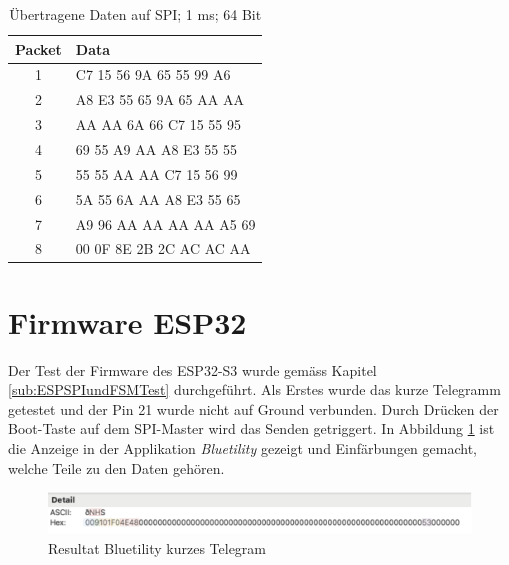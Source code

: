 \begin{table}[h!]
    \centering
    \begin{tabular}{c||l}
        \toprule
        \textbf{Packet} & \textbf{Data} \\ 
        \midrule
        1 & C7 15 56 9A 65 55 99 A6 \\
        2 & A8 E3 55 65 9A 65 AA AA \\
        3 & AA AA 6A 66 C7 15 55 95 \\
        4 & 69 55 A9 AA A8 E3 55 55 \\
        5 & 55 55 AA AA C7 15 56 99 \\
        6 & 5A 55 6A AA A8 E3 55 65 \\
        7 & A9 96 AA AA AA AA A5 69 \\
        8 & 00 0F 8E 2B 2C AC AC AA \\
        \bottomrule
    \end{tabular}
    \caption{Übertragene Daten auf SPI; 1 ms; 64 Bit}
    \label{tab:data_table}
\end{table}





\section{Firmware ESP32}
\label{sec:ResultatESP32}

Der Test der Firmware des ESP32-S3 wurde gemäss Kapitel \ref{sub:ESPSPIundFSMTest} durchgeführt. Als Erstes wurde das kurze Telegramm getestet und der Pin 21 wurde nicht auf Ground verbunden. Durch Drücken der Boot-Taste auf dem SPI-Master wird das Senden getriggert. In Abbildung \ref{fig:ResultatBLEKurz} ist die Anzeige in der Applikation \textit{Bluetility} gezeigt und Einfärbungen gemacht, welche Teile zu den Daten gehören.

\begin{figure}[H]
    \centering
    \includegraphics[width=0.9\linewidth]{Figures/Chap4/ESP32/Resultat_BLE_kurz.png}
    \caption{Resultat Bluetility kurzes Telegram}
    \label{fig:ResultatBLEKurz}
\end{figure}

